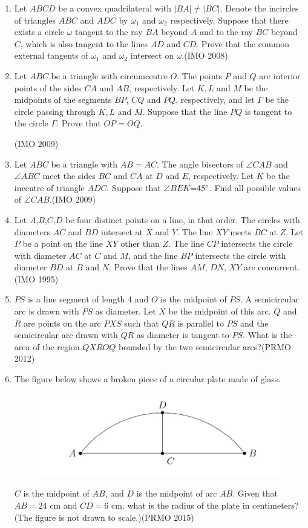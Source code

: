 \begin{enumerate}[label=\thesubsection.\arabic*,ref=\thesubsection.\theenumi]
	\item Let $ABCD$ be a convex quadrilateral with $|BA| \neq |BC|$. Denote the incircles of triangles $ABC$ and $ADC$ by $\omega_{1}$ and $\omega_{2}$ respectively. Suppose that there exists a circle $\omega$ tangent to the ray $BA$ beyond $A$ and to the ray $BC$ beyond $C$, which is also tangent to the lines $AD$ and $CD$. Prove that the common external tangents of $\omega_{1}$ and $\omega_{2}$ intersect on $\omega$.\hfill(IMO  2008)
		\item Let $ABC$ be a triangle with circumcentre $O$. The points $P$  and $Q$ are interior points of the sides $CA$ and $AB$, respectively. Let $K,L$ and $M$ be the midpoints of the segments $BP$, $CQ$ and $PQ$, respectively, and let $\Gamma$ be the circle passing through $K,L$ and $M$. Suppose that the line $PQ$ is tangent to the circle $\Gamma$. Prove that $OP=OQ$.

			\hfill(IMO  2009)
	\item Let $ABC$ be a triangle with $AB=AC$. The angle bisectors of $\angle CAB$ and $\angle ABC$ meet the sides $BC$ and $CA$ at $D$ and $E$, respectively. Let $K$ be the incentre of triangle $ADC$. Suppose that $ \angle BEK$=$45\degree$. Find all possible values of $\angle CAB$.\hfill(IMO  2009)
	\item Let $A$,$B$,$C$,$D$ be four distinct points on a line, in that order. The circles with diameters $AC$ and $BD$ intersect at $X$ and $Y$. The line $XY$ meets $BC$ at $Z$. Let $P$ be a point on the line $XY$ other than $Z$. The line $CP$ intersects the circle with diameter $AC$ at $C$ and $M$, and the line $BP$ intersects the circle with diameter $BD$ at $B$ and $N$. Prove that the lines $AM$, $DN$, $XY$ are concurrent.\hfill(IMO  1995)
\item $PS$ is a line segment of length 4 and $O$ is the midpoint of $PS$. A semicircular arc is drawn with $PS$ as diameter. Let $X$ be the midpoint of this arc. $Q$ and $R$ are points on the arc $PXS$ such that $QR$ is parallel to $PS$ and the semicircular arc drawn with $QR$ as diameter is tangent to $PS$. What is the area of the region $QXROQ$ bounded by the two semicircular arcs?\hfill(PRMO 2012)
\item The figure below shows a broken piece of a circular plate made of glass.
		\begin{figure}[h!]
    \centering
	    \includegraphics[width=\columnwidth]{olympiad/figs/permo.jpg}
			\caption{}
			\label{fig:plate}
    \end{figure}



    $ C $ is the midpoint of $ AB $, and $ D $ is the midpoint of arc $ AB $. Given that $ AB = 24 $ cm and $ CD = 6 $ cm, what is the radius of the plate in centimeters? (The figure is not drawn to scale.)\hfill(PRMO 2015)
\end{enumerate}
